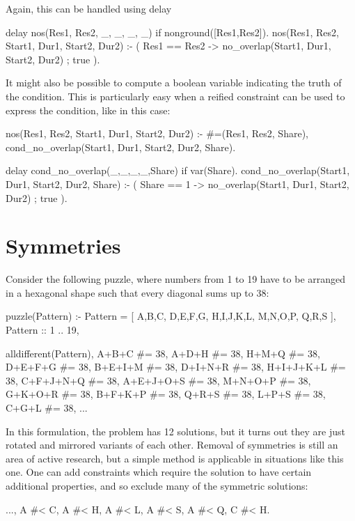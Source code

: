 Again, this can be handled using delay
\begin{code}
delay nos(Res1, Res2, _, _, _, _) if nonground([Res1,Res2]).
nos(Res1, Res2, Start1, Dur1, Start2, Dur2) :-
    ( Res1 == Res2 ->
        no_overlap(Start1, Dur1, Start2, Dur2)
    ;
        true
    ).
\end{code}
It might also be possible to compute a boolean variable indicating the
truth of the condition. This is particularly easy when a reified
constraint can be used to express the condition, like in this case:
\begin{code}
nos(Res1, Res2, Start1, Dur1, Start2, Dur2) :-
    #=(Res1, Res2, Share),
    cond_no_overlap(Start1, Dur1, Start2, Dur2, Share).

delay cond_no_overlap(_,_,_,_,Share) if var(Share).
cond_no_overlap(Start1, Dur1, Start2, Dur2, Share) :-
    ( Share == 1 ->
        no_overlap(Start1, Dur1, Start2, Dur2)
    ;
        true
    ).
\end{code}


\section{Symmetries}

Consider the following puzzle, where numbers from 1 to 19 have to be arranged
in a hexagonal shape such that every diagonal sums up to 38:
\begin{code}
puzzle(Pattern) :-
        Pattern = [
                   A,B,C,
                  D,E,F,G,
                 H,I,J,K,L,
                  M,N,O,P,
                   Q,R,S
                  ],
        Pattern :: 1 .. 19,

        alldifferent(Pattern),
          A+B+C #= 38,     A+D+H #= 38,     H+M+Q #= 38,
         D+E+F+G #= 38,   B+E+I+M #= 38,   D+I+N+R #= 38,
        H+I+J+K+L #= 38, C+F+J+N+Q #= 38, A+E+J+O+S #= 38,
         M+N+O+P #= 38,   G+K+O+R #= 38,   B+F+K+P #= 38,
          Q+R+S #= 38,     L+P+S #= 38,     C+G+L #= 38,
        ...
\end{code}
In this formulation, the problem has 12 solutions, but it turns out they
are just rotated and mirrored variants of each other.
Removal of symmetries is still an area of active research, but a simple
method is applicable in situations like this one.
One can add constraints which require the solution to have certain
additional properties, and so exclude many of the symmetric solutions:
\begin{code}
        ...,
        A #< C, A #< H, A #< L, A #< S, A #< Q,
        C #< H.
\end{code}

